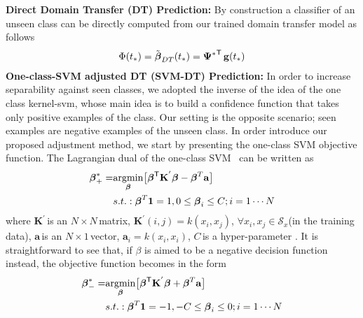 \medskip
\noindent \textbf{Direct Domain Transfer (DT) Prediction:} By construction a classifier of an unseen class can be directly computed from our trained domain transfer model as follows
\small
\begin{equation}
\centering
\begin{split}
\Phi(t_*) = \tilde{\boldsymbol{\beta}}_{DT}(t_*) = {\mathbf{\Psi}^*}^\textsf{T} \, \mathbf{g}(t_*)
\end{split}
\end{equation} 
\normalsize
\medskip
\noindent \textbf{One-class-SVM adjusted DT (SVM-DT) Prediction:} 
In order to increase separability against seen classes, we adopted the inverse of the idea of the one class kernel-svm, whose main idea is to build a confidence function that takes only positive examples of the  class. Our setting is the opposite scenario; seen examples are negative examples of the unseen class.
In order introduce our proposed adjustment method, we  start by presenting the one-class SVM objective function. The  Lagrangian dual  of the one-class SVM~\cite{oneclasssvm07} can be written as
\small
\begin{equation}
\label{eq:1class}
\small
\begin{split}
{\boldsymbol{\beta}}^*_{+} =  &   \underset{\boldsymbol{\beta}}{\operatorname{argmin }}\big[    \boldsymbol{\beta}^\textsf{T} \mathbf{K^{' }}\boldsymbol{\beta} - \boldsymbol{\beta}^T \mathbf{a} \big]\\
&s.t.: \boldsymbol{\beta}^T \mathbf{1} = 1,  0 \le \boldsymbol{\beta}_i \le C; i = 1 \cdots N   \\
\end{split}
\end{equation}
\normalsize
where \small$\mathbf{K^{' }}\,$\normalsize is an \small$N \times N\,$\normalsize matrix, \small$\mathbf{K^{' }}(i,j) = k({x}_i, {x}_j)$\normalsize, \small$\forall {x}_i,{x}_j \in \mathcal{S}_x$\normalsize (\ie in the training data), \small$\textbf{a}\,$\normalsize is an \small$N \times 1\,$\normalsize vector, \small$\textbf{a}_i = k({x}_i, {x}_i)$\normalsize, \small$C\,$\normalsize is a hyper-parameter . It is straightforward to see that, if $\beta$ is aimed to be a negative decision function instead, the objective function becomes in the form
\small
\begin{equation}
\label{eq:1classneg}
\small
\begin{split}
{\boldsymbol{\beta}}^*_{-} =  &   \underset{\boldsymbol{\beta}}{\operatorname{argmin }}\big[    \boldsymbol{\beta}^\textsf{T} \mathbf{K^{' }}\boldsymbol{\beta} + \boldsymbol{\beta}^T \mathbf{a} \big]\\
&s.t.: \boldsymbol{\beta}^T \mathbf{1} = -1, -C \le \boldsymbol{\beta}_i \le 0; i = 1 \cdots N \\
\end{split}
\end{equation}
